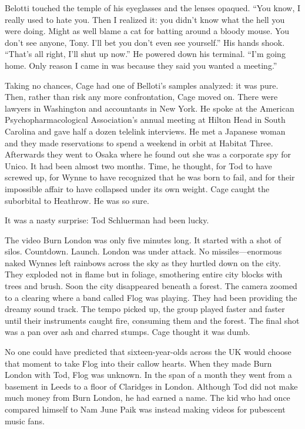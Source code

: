 Belotti touched the temple of his eyeglasses and the lenses opaqued. “You know, I really used to hate you. Then I realized it: you didn’t know what the hell you were doing. Might as well blame a cat for batting around a bloody mouse. You don’t see anyone, Tony. I’ll bet you don’t even see yourself.” His hands shook. “That’s all right, I’ll shut up now.” He powered down his terminal. “I’m going home. Only reason I came in was because they said you wanted a meeting.”

Taking no chances, Cage had one of Belloti’s samples analyzed: it was pure. Then, rather than risk any more confrontation, Cage moved on. There were lawyers in Washington and accountants in New York. He spoke at the American Psychopharmacological Association’s annual meeting at Hilton Head in South Carolina and gave half a dozen telelink interviews. He met a Japanese woman and they made reservations to spend a weekend in orbit at Habitat Three. Afterwards they went to Osaka where he found out she was a corporate spy for Unico. It had been almost two months. Time, he thought, for Tod to have screwed up, for Wynne to have recognized that he was born to fail, and for their impossible affair to have collapsed under its own weight. Cage caught the suborbital to Heathrow. He was so sure.

It was a nasty surprise: Tod Schluerman had been lucky.

The video Burn London was only five minutes long. It started with a shot of silos. Countdown. Launch. London was under attack. No missiles—enormous naked Wynnes left rainbows across the sky as they hurtled down on the city. They exploded not in flame but in foliage, smothering entire city blocks with trees and brush. Soon the city disappeared beneath a forest. The camera zoomed to a clearing where a band called Flog was playing. They had been providing the dreamy sound track. The tempo picked up, the group played faster and faster until their instruments caught fire, consuming them and the forest. The final shot was a pan over ash and charred stumps. Cage thought it was dumb.

No one could have predicted that sixteen-year-olds across the UK would choose that moment to take Flog into their callow hearts. When they made Burn London with Tod, Flog was unknown. In the span of a month they went from a basement in Leeds to a floor of Claridges in London. Although Tod did not make much money from Burn London, he had earned a name. The kid who had once compared himself to Nam June Paik was instead making videos for pubescent music fans.

